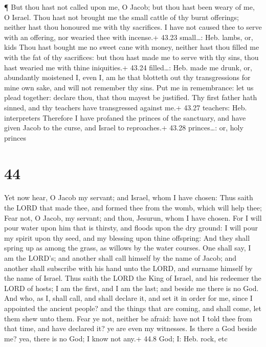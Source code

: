  ¶ But thou hast not called upon me, O Jacob; but thou hast
been weary of me, O Israel.  Thou hast not brought me the
small cattle of thy burnt offerings; neither hast thou honoured me with
thy sacrifices. I have not caused thee to serve with an offering, nor
wearied thee with incense.+ 43.23 small\ldots: Heb. lambs, or, kids
 Thou hast bought me no sweet cane with money, neither hast
thou filled me with the fat of thy sacrifices: but thou hast made me to
serve with thy sins, thou hast wearied me with thine iniquities.+ 43.24
filled\ldots: Heb. made me drunk, or, abundantly moistened 
I, even I, am he that blotteth out thy transgressions for mine own sake,
and will not remember thy sins.  Put me in remembrance: let
us plead together: declare thou, that thou mayest be justified.
 Thy first father hath sinned, and thy teachers have
transgressed against me.+ 43.27 teachers: Heb. interpreters
 Therefore I have profaned the princes of the sanctuary,
and have given Jacob to the curse, and Israel to reproaches.+ 43.28
princes\ldots: or, holy princes

\hypertarget{section-43}{%
\section{44}\label{section-43}}

 Yet now hear, O Jacob my servant; and Israel, whom I have
chosen:  Thus saith the LORD that made thee, and formed thee
from the womb, which will help thee; Fear not, O Jacob, my servant; and
thou, Jesurun, whom I have chosen.  For I will pour water
upon him that is thirsty, and floods upon the dry ground: I will pour my
spirit upon thy seed, and my blessing upon thine offspring: 
And they shall spring up as among the grass, as willows by the water
courses.  One shall say, I am the LORD's; and another shall
call himself by the name of Jacob; and another shall subscribe with his
hand unto the LORD, and surname himself by the name of Israel.
 Thus saith the LORD the King of Israel, and his redeemer
the LORD of hosts; I am the first, and I am the last; and beside me
there is no God.  And who, as I, shall call, and shall
declare it, and set it in order for me, since I appointed the ancient
people? and the things that are coming, and shall come, let them shew
unto them.  Fear ye not, neither be afraid: have not I told
thee from that time, and have declared it? ye are even my witnesses. Is
there a God beside me? yea, there is no God; I know not any.+ 44.8 God;
I: Heb. rock, etc

